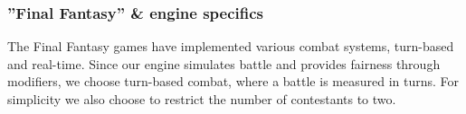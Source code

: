 \subsubsection*{''Final Fantasy'' \& engine specifics}
The Final Fantasy games have implemented various combat systems, turn-based and real-time.\cite{ffantasy}
Since our engine simulates battle and provides fairness through modifiers, we choose turn-based combat, where a battle is measured in turns.
For simplicity we also choose to restrict the number of contestants to two.



